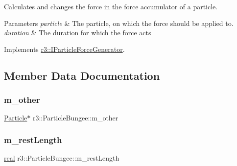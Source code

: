 Calculates and changes the force in the force accumulator of a particle. 


\begin{DoxyParams}{Parameters}
{\em particle} & The particle, on which the force should be applied to. \\
\hline
{\em duration} & The duration for which the force acts \\
\hline
\end{DoxyParams}


Implements \mbox{\hyperlink{classr3_1_1_i_particle_force_generator_a8b692fc3a40f815dc44c106b451c3a90}{r3\+::\+I\+Particle\+Force\+Generator}}.



\subsection{Member Data Documentation}
\mbox{\label{classr3_1_1_particle_bungee_ab5c8ec0ee5390b785e02e4dac28f9b5c}} 
\subsubsection{\texorpdfstring{m\+\_\+other}{m\_other}}
{\footnotesize\ttfamily \mbox{\hyperlink{classr3_1_1_particle}{Particle}}$\ast$ r3\+::\+Particle\+Bungee\+::m\+\_\+other\hspace{0.3cm}{\ttfamily [protected]}}

\mbox{\label{classr3_1_1_particle_bungee_aeefefba54d7f8080424c17d12cb9ca06}} 
\subsubsection{\texorpdfstring{m\+\_\+rest\+Length}{m\_restLength}}
{\footnotesize\ttfamily \mbox{\hyperlink{namespacer3_ab2016b3e3f743fb735afce242f0dc1eb}{real}} r3\+::\+Particle\+Bungee\+::m\+\_\+rest\+Length\hspace{0.3cm}{\ttfamily [protected]}}

\mbox{\label{classr3_1_1_particle_bungee_a5fb1a60d165188d6871ba8b6410c9e84}} 
